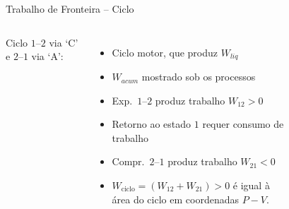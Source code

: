    \begin{frame}{Trabalho de Fronteira -- Ciclo}\vspace*{-2em}
        \begin{columns}
        Ciclo $1$--$2$ via `C' e $2$--$1$ via `A':
        \begin{itemize}
            \item<1> Ciclo \alert{motor}, que \alert{produz} $W_{liq}$
            \item<0> $W_{acum}$ mostrado sob os processos
            \item<0> Exp.~$1$--$2$ \alert{produz} trabalho $W_{12} > 0$
            \item<0> Retorno ao estado $1$ requer \alert{consumo} de trabalho
            \item<0> Compr.~$2$--$1$ \alert{produz} trabalho $W_{21} < 0$
            \item<0> $W_{\mathrm{ciclo}} = (W_{12} + W_{21}) > 0$ é igual à \alert{área do
                ciclo} em \alert{coordenadas $P-V$}.
        \end{itemize}
            \begin{figure}
            \end{figure}
        \end{columns}
    \end{frame}
